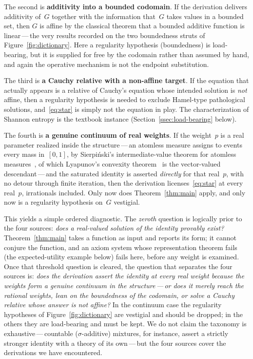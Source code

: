 \documentclass{article}
\theoremstyle{plain}
\theoremstyle{definition}
\begin{document}
The second is \textbf{additivity into a bounded codomain}. If the
derivation delivers additivity of~$G$ together with the information
that~$G$ takes values in a bounded set, then $G$ is affine by the
classical theorem that a bounded additive function is linear\,---\,the
very results recorded on the two boundedness struts of
Figure~\ref{fig:dictionary}. Here a regularity hypothesis (boundedness)
is load-bearing, but it is supplied for free by the codomain rather
than assumed by hand, and again the operative mechanism is not the
endpoint substitution.

The third is \textbf{a Cauchy relative with a non-affine target}. If
the equation that actually appears is a relative of Cauchy's equation
whose intended solution is \emph{not} affine, then a regularity
hypothesis is needed to exclude Hamel-type pathological solutions,
and~\eqref{eq:star} is simply not the equation in play. The
characterization of Shannon entropy is the textbook instance
(Section~\ref{ssec:load-bearing} below).

The fourth is \textbf{a genuine continuum of real weights}. If the
weight~$p$ is a real parameter realized inside the
structure\,---\,an atomless measure assigns to events every mass
in~$[0,1]$, by Sierpi\'nski's intermediate-value theorem for atomless
measures~\cite{Sierpinski1922}, of which Lyapunov's convexity
theorem~\cite{Lyapunov1940} is the vector-valued
descendant\,---\,and the saturated
identity is asserted \emph{directly} for that real~$p$, with no
detour through finite iteration, then the derivation
licenses~\eqref{eq:star} at every real~$p$, irrationals included.
Only now does Theorem~\ref{thm:main} apply, and only now is a
regularity hypothesis on~$G$ vestigial.

This yields a simple ordered diagnostic. The \emph{zeroth} question is
logically prior to the four sources: \emph{does a real-valued solution
of the identity provably exist?} Theorem~\ref{thm:main} takes a
function as input and reports its form; it cannot conjure the
function, and an axiom system whose representation theorem fails (the
expected-utility example below) fails here, before any weight is
examined. Once that threshold question is cleared, the question that separates the
four sources is: \emph{does the derivation assert the identity at
every real weight because the weights form a genuine continuum in the
structure\,---\,or does it merely reach the rational weights, lean on
the boundedness of the codomain, or solve a Cauchy relative whose
answer is not affine?} In the continuum case the regularity hypotheses
of Figure~\ref{fig:dictionary} are vestigial and should be dropped; in
the others they are load-bearing and must be kept. We do not claim the
taxonomy is exhaustive\,---\,countable ($\sigma$-additive) mixtures,
for instance, assert a strictly stronger identity with a theory of its
own\,---\,but the four sources cover the derivations we have
encountered.
\end{document}
